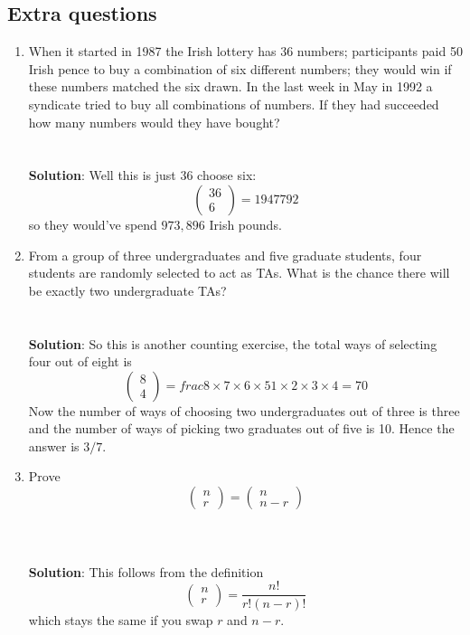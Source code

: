 \documentclass[11pt,a4paper]{scrartcl}
\begin{document}
\subsection*{Extra questions}

\begin{enumerate}


\item When it started in 1987 the Irish lottery has 36 numbers;
  participants paid 50 Irish pence to buy a combination of six
  different numbers; they would win if these numbers matched the six
  drawn. In the last week in May in 1992 a syndicate tried to buy all
  combinations of numbers. If they had succeeded how many numbers
  would they have bought?\\ \\ \\ \textbf{Solution}: Well this is just 36 choose six:
\begin{equation}
\left(\begin{array}{c}36\\6\end{array}\right)=1947792
\end{equation}
so they would've spend $973,896$ Irish pounds.


\item From a group of three undergraduates and five graduate students,
  four students are randomly selected to act as TAs. What is the
  chance there will be exactly two undergraduate
  TAs?\\ \\ \\ \textbf{Solution}: So this is another counting exercise,
  the total ways of selecting four out of eight is
\begin{equation}
\left(\begin{array}{c}8\\4\end{array}\right)=frac{8\times 7\times 6 \times 5}{1\times 2\times 3\times 4}
=70
\end{equation}
Now the number of ways of choosing two undergraduates out of three is
three and the number of ways of picking two graduates out of five is
10. Hence the answer is $3/7$.


\item Prove
\begin{equation}
\left(\begin{array}{c}n\\r\end{array}\right)=\left(\begin{array}{c}n\\n-r\end{array}\right)
\end{equation}
\\ \\ \\ \textbf{Solution}: This follows from the definition
\begin{equation}
\left(\begin{array}{c}n\\r\end{array}\right)=\frac{n!}{r!(n-r)!}
\end{equation}
which stays the same if you swap $r$ and $n-r$.


\end{enumerate}
\end{document}
